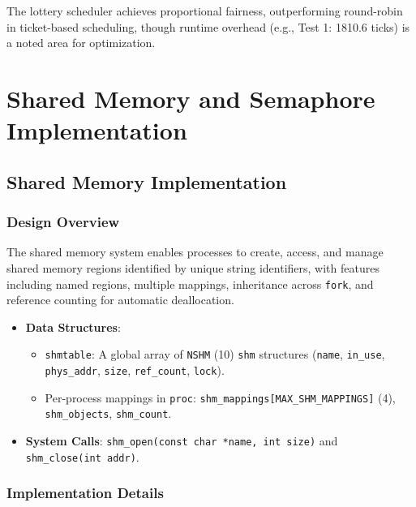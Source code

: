 \documentclass[12pt]{article}
\begin{document}
The lottery scheduler achieves proportional fairness, outperforming round-robin in ticket-based scheduling, though runtime overhead (e.g., Test 1: 1810.6 ticks) is a noted area for optimization.

\section{Shared Memory and Semaphore Implementation}
\label{sec:shared-memory-semaphores}

\subsection{Shared Memory Implementation}
\label{subsec:shared-memory-implementation}

\subsubsection{Design Overview}
\label{subsubsec:shared-memory-design}

The shared memory system enables processes to create, access, and manage shared memory regions identified by unique string identifiers, with features including named regions, multiple mappings, inheritance across \texttt{fork}, and reference counting for automatic deallocation.

\begin{itemize}
  \item \textbf{Data Structures}:
    \begin{itemize}
      \item \texttt{shmtable}: A global array of \texttt{NSHM} (10) \texttt{shm} structures (\texttt{name}, \texttt{in\_use}, \texttt{phys\_addr}, \texttt{size}, \texttt{ref\_count}, \texttt{lock}).
      \item Per-process mappings in \texttt{proc}: \texttt{shm\_mappings[MAX\_SHM\_MAPPINGS]} (4), \texttt{shm\_objects}, \texttt{shm\_count}.
    \end{itemize}
  \item \textbf{System Calls}: \texttt{shm\_open(const char *name, int size)} and \texttt{shm\_close(int addr)}.
\end{itemize}

\subsubsection{Implementation Details}
\label{subsubsec:shared-memory-implementation-details}
\end{document}
